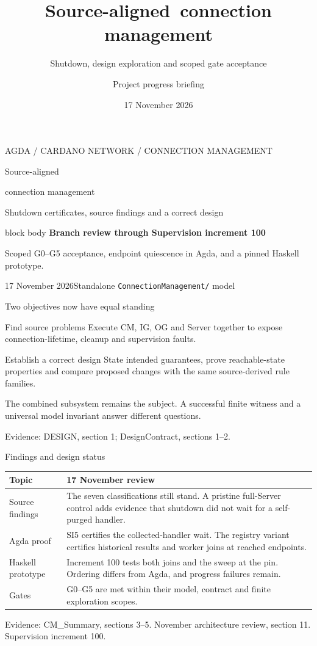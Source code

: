 \documentclass[11pt,aspectratio=169]{beamer}
\title{Source-aligned\ connection management}
\subtitle{Shutdown, design exploration and scoped gate acceptance}
\author{Project progress briefing}
\date{17 November 2026}
\newcommand{\evidence}[1]{\vfill{\fontsize{7}{8}\selectfont\color{Muted}Evidence: #1\par}}
\begin{document}
\begin{frame}[plain]
\par\vspace{5mm}
{\color{Teal}\small AGDA / CARDANO NETWORK / CONNECTION MANAGEMENT}\par\vspace{6mm}
{\color{Navy}Source-aligned\par connection management}\par\vspace{4mm}
{\large Shutdown certificates, source findings and a correct design}\par\vspace{6mm}
\begin{beamercolorbox}[sep=3mm,wd=\textwidth]{block body}
\textbf{Branch review through Supervision increment 100}\par
\small Scoped G0--G5 acceptance, endpoint quiescence in Agda, and a pinned Haskell prototype.
\end{beamercolorbox}
\vfill\small 17 November 2026\hfill Standalone \texttt{ConnectionManagement/} model
\end{frame}

\begin{frame}{Two objectives now have equal standing}
\begin{block}{Find source problems}
Execute CM, IG, OG and Server together to expose connection-lifetime, cleanup and supervision faults.
\end{block}\begin{block}{Establish a correct design}
State intended guarantees, prove reachable-state properties and compare proposed changes with the same source-derived rule families.
\end{block}\small The combined subsystem remains the subject. A successful finite witness and a universal model invariant answer different questions.
\evidence{DESIGN, section 1; DesignContract, sections 1--2.}
\end{frame}

\begin{frame}{Findings and design status}
\small\renewcommand{\arraystretch}{1.2}
\begin{tabularx}{\textwidth}{@{}P{27mm}Y@{}}
\toprule
Topic & 17 November review \\ \midrule
Source findings & The seven classifications still stand. A pristine full-Server control adds evidence that shutdown did not wait for a self-purged handler. \\[2mm]
Agda proof & SI5 certifies the collected-handler wait. The registry variant certifies historical results and worker joins at reached endpoints. \\[2mm]
Haskell prototype & Increment 100 tests both joins and the sweep at the pin. Ordering differs from Agda, and progress failures remain. \\[2mm]
Gates & G0--G5 are met within their model, contract and finite exploration scopes. \\[2mm]
\bottomrule
\end{tabularx}
\evidence{CM\_Summary, sections 3--5. November architecture review, section 11. Supervision increment 100.}
\end{frame}
\end{document}

